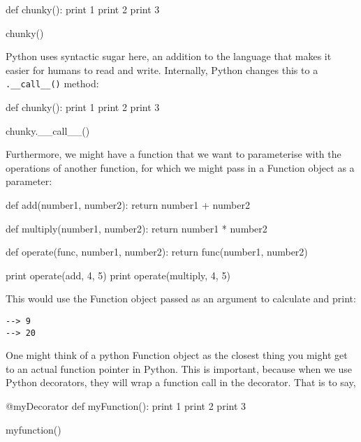 \begin{pyglist}[language = python, encoding = utf8, caption = {A basic Python example}, listingname=\textbf{Code Sample}, numbers=left]
def chunky():
  print 1
  print 2
  print 3
  
chunky()
\end{pyglist} \par

Python uses syntactic sugar here, an addition to the language that makes it easier for humans to read and write. Internally, Python changes this to a \texttt{.\_\_call\_\_()} method: \par

\begin{pyglist}[language = python, encoding = utf8, caption = {Demonstrating Python's \_\_call\_\_() syntactic sugar}, listingname=\textbf{Code Sample}, numbers=left]
def chunky():
  print 1
  print 2
  print 3
  
chunky.__call__()
\end{pyglist} \par

Furthermore, we might have a function that we want to parameterise with the operations of another function, for which we might pass in a Function object as a parameter: 

\begin{pyglist}[language = python, encoding = utf8, caption = {Python function objects can be passed and run, like a function pointer}, listingname=\textbf{Code Sample}, numbers=left]
def add(number1, number2):
  return number1 + number2
  
def multiply(number1, number2):
  return number1 * number2
  
def operate(func, number1, number2):
  return func(number1, number2)

print operate(add, 4, 5)
print operate(multiply, 4, 5)
\end{pyglist} \par

This would use the Function object passed as an argument to calculate and print: \par

\begin{verbatim}
--> 9
--> 20    
\end{verbatim}\par

One might think of a python Function object as the closest thing you might get to an actual function pointer in Python. This is important, because when we use Python decorators, they will wrap a function call in the decorator. That is to say, 
\begin{pyglist}[language = python, encoding = utf8, caption = {A basic decorator example}, listingname=\textbf{Code Sample}, numbers=left]
@myDecorator
def myFunction():
  print 1
  print 2
  print 3
  
myfunction()
\end{pyglist} \par

